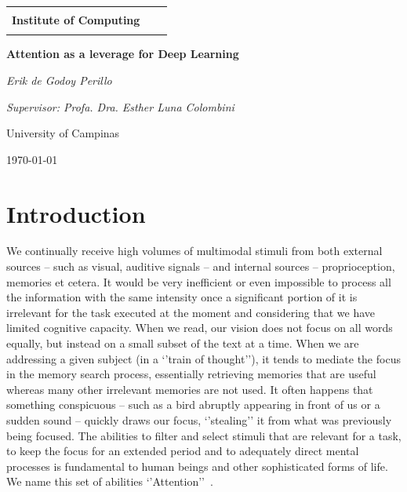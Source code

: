 \documentclass[12pt]{article}
\makeatletter
\def\logos{
  \noindent
  \begin{center}
  \begin{tabular}{ccc}
    \raisebox{-.5\height}{\LogoUnicamp}
    &
    \begin{minipage}{.6\textwidth}
      \centering
      \textbf{\@UNICAMP} \\
      \textbf{Institute of Computing} \\
    \end{minipage}
    &
    \raisebox{-.45\height}{\scalebox{1.11}{\LogoIcUnicampWithName}}
  \end{tabular}
  \end{center}
}
\makeatother
\begin{document}

\begin{titlepage}
    \logos
	\centering
	\vspace{1.5cm}
	{\huge\bfseries Attention as a leverage for Deep Learning\par}
	\vspace{1cm}
	{\itshape Erik de Godoy Perillo\par}
	{\itshape Supervisor: Profa. Dra. Esther Luna Colombini\par}
	\vfill
	University of Campinas
	\vfill
	{\large \today\par}
\end{titlepage}

\newpage

\begin{abstract}
    Attention is fundamental for intelligent beings.
    It is necessary for filtering the significant volumes of stimuli we constantly receive
    and for applying the adequate mental resources to perform tasks.
    Deep Learning is currently broadly applied to Artificial Intelligence.
    The use of Attention in Deep Learning has been increasingly frequent,
    resulting many times in better results.
    In this context, this work proposes the study and elaboration of approaches
    to use Attention in Deep Learning
    for more power and efficiency to solve problems in Artificial Intelligence.
    We aim at obtaining a framework generically applicable in broad problem classes
    such as Computer Vision, Natural Language Processing, Program Composition and others.
\end{abstract}

\newpage

\section{Introduction}
We continually receive high volumes of multimodal stimuli from both external sources
-- such as visual, auditive signals -- and internal sources -- proprioception, memories et cetera.
It would be very inefficient or even impossible to process all the information with
the same intensity once a significant portion of it is irrelevant for
the task executed at the moment and considering that we have limited cognitive capacity.
When we read, our vision does not focus on all
words equally, but instead on a small subset of the text at a time.
When we are addressing a given subject (in a `'train of thought''), it tends to mediate the focus
in the memory search process, essentially retrieving memories that
are useful whereas many other irrelevant memories are not used.
It often happens that something conspicuous
-- such as a bird abruptly appearing in front of us or a sudden sound --
quickly draws our focus, `'stealing'' it from what was previously being focused.
The abilities to filter and select stimuli that are relevant for a task, to keep the focus for an
extended period and to adequately direct mental processes is fundamental to
human beings and other sophisticated forms of life.
We name this set of abilities `'Attention''~\cite{ref:esther-thesis}.
\end{document}
